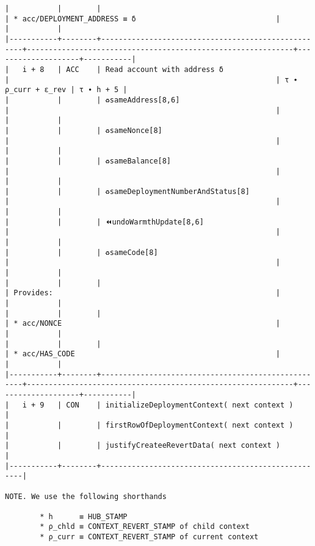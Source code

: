 \documentclass[varwidth=\maxdimen,margin=0.5cm,multi={verbatim}]{standalone}
\begin{document}
\begin{verbatim}
|           |        |                                                    | * acc/DEPLOYMENT_ADDRESS ≡ δ                                |                    |           |
|-----------+--------+----------------------------------------------------+-------------------------------------------------------------+--------------------+-----------|
|   i + 8   | ACC    | Read account with address δ                        |                                                             | τ ∙ ρ_curr + ε_rev | τ ∙ h + 5 |
|           |        | ♻️sameAddress[8,6]                                 |                                                             |                    |           |
|           |        | ♻️sameNonce[8]                                     |                                                             |                    |           |
|           |        | ♻️sameBalance[8]                                   |                                                             |                    |           |
|           |        | ♻️sameDeploymentNumberAndStatus[8]                 |                                                             |                    |           |
|           |        | ⏪undoWarmthUpdate[8,6]                            |                                                             |                    |           |
|           |        | ♻️sameCode[8]                                      |                                                             |                    |           |
|           |        |                                                    | Provides:                                                   |                    |           |
|           |        |                                                    | * acc/NONCE                                                 |                    |           |
|           |        |                                                    | * acc/HAS_CODE                                              |                    |           |
|-----------+--------+----------------------------------------------------+-------------------------------------------------------------+--------------------+-----------|
|   i + 9   | CON    | initializeDeploymentContext( next context )        |
|           |        | firstRowOfDeploymentContext( next context )        |
|           |        | justifyCreateeRevertData( next context )           |
|-----------+--------+----------------------------------------------------|

NOTE. We use the following shorthands

        * h      ≡ HUB_STAMP
        * ρ_chld ≡ CONTEXT_REVERT_STAMP of child context
        * ρ_curr ≡ CONTEXT_REVERT_STAMP of current context

\end{verbatim}
\end{document}
